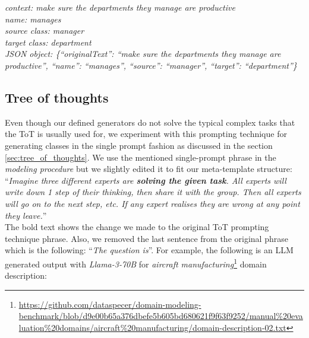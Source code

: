\noindent{}\textit{context: make sure the departments they manage are productive} \\
\textit{name: manages} \\
\textit{source class: manager} \\
\textit{target class: department} \\
\textit{JSON object: \{``originalText'': ``make sure the departments they manage are productive'', ``name'': ``manages'', ``source'': ``manager'', ``target'': ``department''\}}


\subsection{Tree of thoughts}

Even though our defined generators do not solve the typical complex tasks that the ToT is usually used for, we experiment with this prompting technique for generating classes in the single prompt fashion as discussed in the section \ref{sec:tree_of_thoughts}. We use the mentioned single-prompt phrase in the \emph{modeling procedure} but we slightly edited it to fit our meta-template structure: \\

\noindent{}``\textit{Imagine three different experts are \textbf{solving the given task}. All experts will write down 1 step of their thinking, then share it with the group. Then all experts will go on to the next step, etc. If any expert realises they are wrong at any point they leave.}'' \\

\noindent{}The bold text shows the change we made to the original ToT prompting technique phrase. Also, we removed the last sentence from the original phrase which is the following: ``\textit{The question is}''. For example, the following is an LLM generated output with \emph{Llama-3-70B} for \textit{aircraft manufacturing}\footnote{\url{https://github.com/dataspecer/domain-modeling-benchmark/blob/d9e00b65a376dbefe5b605bd680621f9f63f9252/manual\%20evaluation\%20domains/aircraft\%20manufacturing/domain-description-02.txt}} domain description: \\

